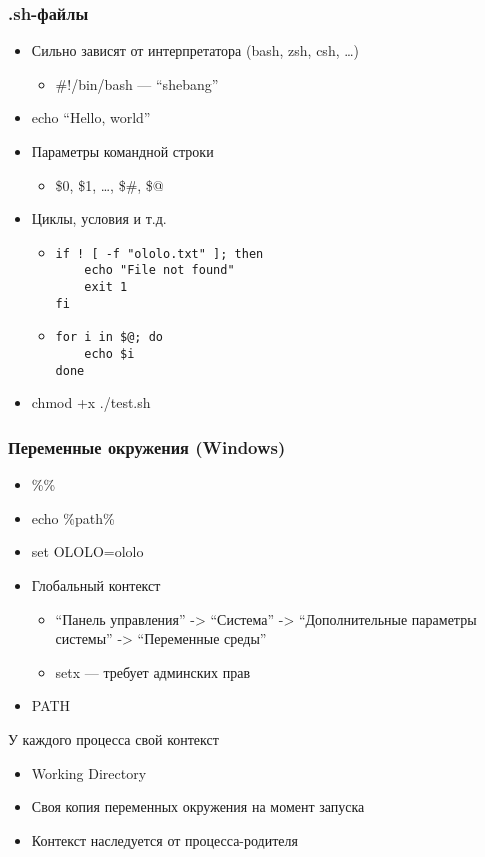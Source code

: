 \documentclass[xetex,mathserif,serif]{beamer}
\begin{document}
	\begin{frame}[fragile]
		\frametitle{.sh-файлы}
		\begin{itemize}
			\item Сильно зависят от интерпретатора (bash, zsh, csh, …)
			\begin{itemize}
				\item \#!/bin/bash --- ``shebang''
			\end{itemize}
			\item echo ``Hello, world''
			\item Параметры командной строки
			\begin{itemize}
				\item \$0, \$1, …, \$\#, \$@
			\end{itemize}
			\item Циклы, условия и т.д.
			\begin{itemize}
				\item 
				\begin{footnotesize}
					\begin{verbatim}
if ! [ -f "ololo.txt" ]; then
    echo "File not found"
    exit 1
fi
					\end{verbatim}
				\end{footnotesize}
				\item 
				\begin{footnotesize}
					\begin{verbatim}
for i in $@; do
    echo $i
done
					\end{verbatim}
				\end{footnotesize}
			\end{itemize}
			\item chmod +x ./test.sh
		\end{itemize}
	\end{frame}

	\begin{frame}
		\frametitle{Переменные окружения (Windows)}
		\begin{itemize}
			\item \%<имя переменной>\%
			\item echo \%path\%
			\item set OLOLO=ololo
			\item Глобальный контекст
			\begin{itemize}
				\item ``Панель управления'' -> ``Система'' -> ``Дополнительные параметры системы'' -> ``Переменные среды''
				\item setx --- требует админских прав
			\end{itemize}
			\item PATH
		\end{itemize}

		У каждого процесса свой контекст
		\begin{itemize}
			\item Working Directory
			\item Своя копия переменных окружения на момент запуска
			\item Контекст наследуется от процесса-родителя
		\end{itemize}
	\end{frame}
\end{document}
